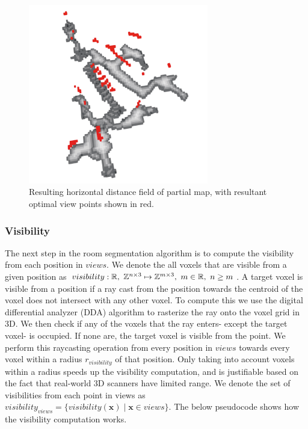 \begin{figure}[h]
    \centering
    \includegraphics*[width=0.7\textwidth]{./fig/horizontal_distance_field.png}
    \caption{Resulting horizontal distance field of partial map, with resultant optimal view points shown in red.}
    \label{fig:hdf}
\end{figure}

\subsubsection{Visibility}
The next step in the room segmentation algorithm is to compute the visibility from each position in \(views\). We denote the all voxels that are visible from a given position as \(visibility: \mathbb{R},\ \mathbb{Z}^{n \times 3} \mapsto \mathbb{Z}^{m \times 3},\ m \in \mathbb{R},\ n \geq m\). A target voxel is visible from a position if a ray cast from the position towards the centroid of the voxel does not intersect with any other voxel. To compute this we use the digital differential analyzer (DDA) algorithm to rasterize the ray onto the voxel grid in 3D. We then check if any of the voxels that the ray enters- except the target voxel- is occupied. If none are, the target voxel is visible from the point. We perform this raycasting operation from every position in \(views\) towards every voxel within a radius \(r_{visibility}\) of that position. Only taking into account voxels within a radius speeds up the visibility computation, and is justifiable based on the fact that real-world 3D scanners have limited range. We denote the set of visibilities from each point in views as \(visibility_{views} = \{visibility(\boldsymbol{x}) \mid \boldsymbol{x} \in views\}\). The below pseudocode shows how the visibility computation works.

